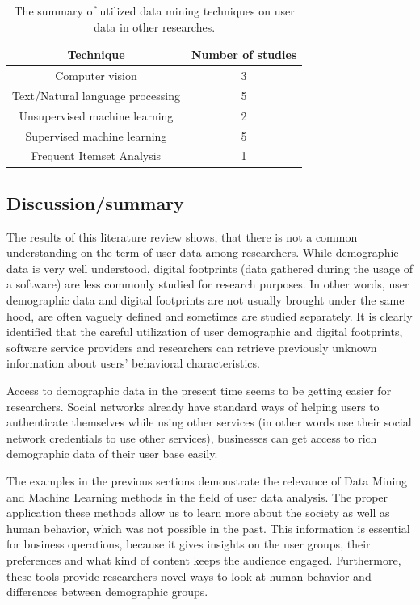   \begin{table}[!t]
    \renewcommand{\arraystretch}{1.5}
    \caption{The summary of utilized data mining techniques on user data in other researches.}
    \label{table_of_techniques}
    \centering
      \begin{tabular}{c||c}
        Technique & Number of studies \\ 
        \hline
        Computer vision & 3  \\
        Text/Natural language processing & 5 \\
        Unsupervised machine learning & 2 \\
        Supervised machine learning & 5 \\
        Frequent Itemset Analysis & 1
      \end{tabular}
  \end{table}

\subsection{Discussion/summary}
The results of this literature review shows, that there is not a common understanding on the term of user data among researchers. While demographic data is very well understood, digital footprints (data gathered during the usage of a software) are less commonly studied for research purposes. In other words, user demographic data and digital footprints are not usually brought under the same hood, are often vaguely defined and sometimes are studied separately. It is clearly identified that the careful utilization of user demographic and digital footprints, software service providers and researchers can retrieve previously unknown information about users' behavioral characteristics. 

Access to demographic data in the present time seems to be getting easier for researchers. Social networks already have standard ways of helping users to authenticate themselves while using other services (in other words use their social network credentials to use other services), businesses can get access to rich demographic data of their user base easily. 

The examples in the previous sections demonstrate the relevance of Data Mining and Machine Learning methods in the field of user data analysis. The proper application these methods allow us to learn more about the society as well as human behavior, which was not possible in the past. This information is essential for business operations, because it gives insights on the user groups, their preferences and what kind of content keeps the audience engaged. Furthermore, these tools provide researchers novel ways to look at human behavior and differences between demographic groups.

